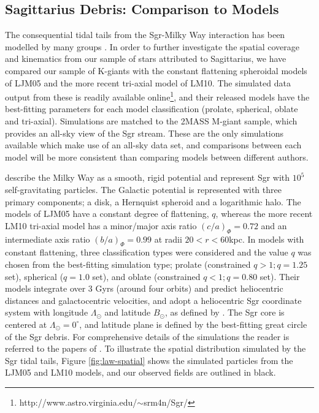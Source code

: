 \documentclass{emulateapj}
\begin{document}
		
	\subsection{Sagittarius Debris: Comparison to Models}
		
	The consequential tidal tails from the Sgr-Milky Way interaction has been modelled by many groups \citep[e.g. ][]{Helmi_2004, Law;et-al_2005, Law;Majewski_2010}. In order to further investigate the spatial coverage and kinematics from our sample of stars attributed to Sagittarius, we have compared our sample of K-giants with the constant flattening spheroidal models of LJM05 and the more recent tri-axial model of LM10. The simulated data output from these is readily available online\footnote{http://www.astro.virginia.edu/$\sim$srm4n/Sgr/}, and their released models have the best-fitting parameters for each model classification (prolate, spherical, oblate and tri-axial). Simulations are matched to the 2MASS M-giant sample, which provides an all-sky view of the Sgr stream. These are the only simulations available which make use of an all-sky data set, and comparisons between each model will be more consistent than comparing models between different authors.
		
		\citet{Law;et-al_2005} describe the Milky Way as a smooth, rigid potential and represent Sgr with $10^5$ self-gravitating particles. The Galactic potential is represented with three primary components; a \citet{Miyamoto;Nagai_1975} disk, a Hernquist spheroid and a logarithmic halo. The models of LJM05 have a constant degree of flattening, $q$, whereas the more recent LM10 tri-axial model has a minor/major axis ratio $(c/a)_\Phi = 0.72$ and an intermediate axis ratio $(b/a)_\Phi = 0.99$ at radii $20 < r < 60 $kpc. In models with constant flattening, three classification types were considered and the value $q$ was chosen from the best-fitting simulation type; prolate (constrained $q > 1; q = 1.25$ set), spherical ($q = 1.0$ set), and oblate (constrained $q < 1; q = 0.80$ set). Their models integrate over 3 Gyrs (around four orbits) and predict heliocentric distances and galactocentric velocities, and adopt a heliocentric Sgr coordinate system with longitude $\Lambda_\odot$ and latitude $B_\odot$, as defined by \citet{Majewski;et-al_2003}. The Sgr core is centered at $\Lambda_\odot = 0^\circ$, and latitude plane is defined by the best-fitting great circle of the Sgr debris. For comprehensive details of the simulations the reader is referred to the papers of \citet{Law;et-al_2005, Law;Majewski_2010}. To illustrate the spatial distribution simulated by the Sgr tidal tails, Figure \ref{fig:law-spatial} shows the simulated particles from the LJM05 and LM10 models, and our observed fields are outlined in black. 
		
\end{document}
